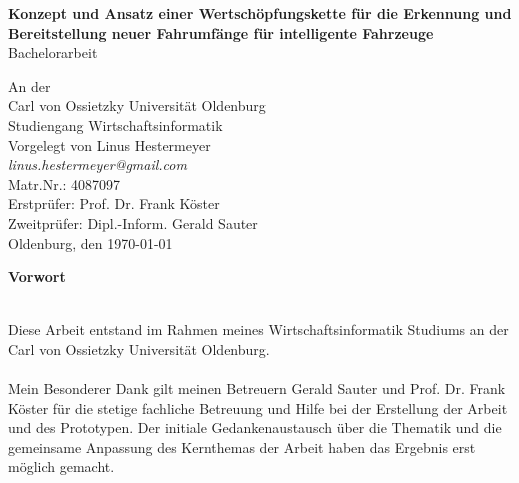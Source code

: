 \documentclass{article}
\begin{document}
\begin{titlepage}
	\begin{figure}[H]
		\centering
	\end{figure}
	
	\begin{center}
		\large{\textbf{Konzept und Ansatz einer Wertschöpfungskette für die Erkennung und Bereitstellung neuer Fahrumfänge für intelligente Fahrzeuge}}\\
		\large Bachelorarbeit
	\end{center}
	\vfill
	\begin{center}
		\large{
			An der\\
			Carl von Ossietzky Universität Oldenburg\\
			Studiengang Wirtschaftsinformatik\\
			
			\vspace{1cm}
			Vorgelegt von Linus Hestermeyer\\ 
			\textit{linus.hestermeyer@gmail.com}\\
			Matr.Nr.: 4087097\\
			\vfill
			Erstprüfer: Prof. Dr. Frank Köster\\
			Zweitprüfer: Dipl.-Inform. Gerald Sauter\\
			\vfill
			\noindent
			Oldenburg, den \today
		}
	\end{center}
\end{titlepage}
\clearpage
\newpage
\thispagestyle{empty}
\null
\newpage
\thispagestyle{empty}
\null
\begin{huge}
	\textbf{Vorwort}\\\\
\end{huge}
Diese Arbeit entstand im Rahmen meines Wirtschaftsinformatik Studiums an der Carl von Ossietzky Universität Oldenburg.\\\\
Mein Besonderer Dank gilt meinen Betreuern Gerald Sauter und Prof. Dr. Frank Köster für die stetige fachliche Betreuung und Hilfe bei der Erstellung der Arbeit und des Prototypen. Der initiale Gedankenaustausch über die Thematik und die gemeinsame Anpassung des Kernthemas der Arbeit haben das Ergebnis erst möglich gemacht.\\\\
\end{document}

